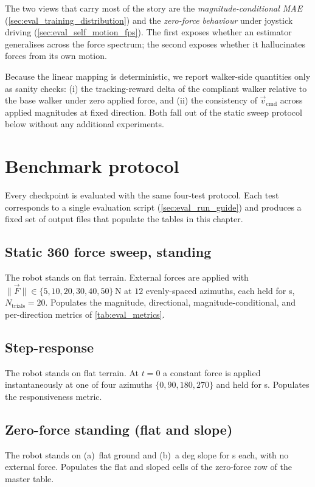 The two views that carry most of the story are the \emph{magnitude-conditional
MAE} (\cref{sec:eval_training_distribution}) and the \emph{zero-force
behaviour} under joystick driving (\cref{sec:eval_self_motion_fps}). The
first exposes whether an estimator generalises across the force spectrum;
the second exposes whether it hallucinates forces from its own motion.

Because the linear mapping is deterministic, we report walker-side
quantities only as sanity checks: (i) the tracking-reward delta of the
compliant walker relative to the base walker under zero applied force, and
(ii) the consistency of $\vec{v}_{\text{cmd}}$ across applied magnitudes at
fixed direction. Both fall out of the static sweep protocol below without
any additional experiments.

\section{Benchmark protocol}
\label{sec:eval_protocol}

Every checkpoint is evaluated with the same four-test protocol. Each test
corresponds to a single evaluation script
(\cref{sec:eval_run_guide}) and produces a fixed set of output files that
populate the tables in this chapter.

\subsection{Static 360\textdegree{} force sweep, standing}
The robot stands on flat terrain. External forces are applied with
$\|\vec{F}\|\in\{5, 10, 20, 30, 40, 50\}\,$N at $12$ evenly-spaced
azimuths, each held for \unit[4]{s}, $N_{\text{trials}}=20$. Populates
the magnitude, directional, magnitude-conditional, and per-direction
metrics of \cref{tab:eval_metrics}.

\subsection{Step-response}
The robot stands on flat terrain. At $t=0$ a constant force is applied
instantaneously at one of four azimuths $\{0,90,180,270\}$\textdegree{} and
held for \unit[2]{s}. Populates the responsiveness metric.

\subsection{Zero-force standing (flat and slope)}
The robot stands on (a)~flat ground and (b)~a \unit[15]{deg} slope for
\unit[10]{s} each, with no external force. Populates the flat and sloped
cells of the zero-force row of the master table.

